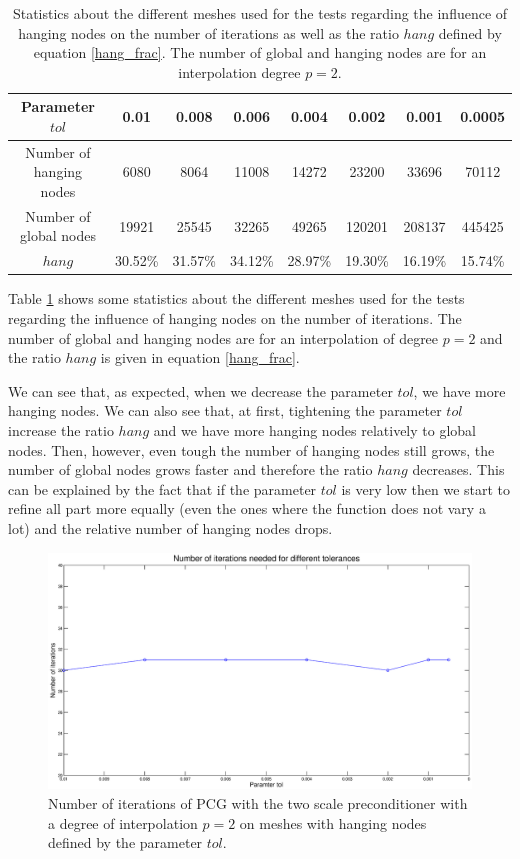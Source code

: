 \begin{table}
\centering
\begin{tabular}{c|ccccccc}
Parameter $tol$ & 0.01 & 0.008 & 0.006 & 0.004 & 0.002 & 0.001 & 0.0005\\
\hline
Number of hanging nodes & 6080 & 8064 & 11008 & 14272 & 23200 & 33696 & 70112\\
Number of global nodes & 19921 & 25545 & 32265 & 49265 & 120201 & 208137 & 445425\\
$hang$ & 30.52\% & 31.57\% & 34.12\% & 28.97\% & 19.30\% & 16.19\% & 15.74\%
\end{tabular}
\caption{Statistics about the different meshes used for the tests regarding the influence of hanging nodes on the number of iterations as well as the ratio $hang$ defined by equation \ref{hang_frac}. The number of global and hanging nodes are for an interpolation degree $p=2$.}
\label{two_hang_table}
\end{table}

Table \ref{two_hang_table} shows some statistics about the different meshes used for the tests regarding the influence of hanging nodes on the number of iterations. The number of global and hanging nodes are for an interpolation of degree $p=2$ and the ratio $hang$ is given in equation \ref{hang_frac}.

We can see that, as expected, when we decrease the parameter $tol$, we have more hanging nodes. We can also see that, at first, tightening the parameter $tol$ increase the ratio $hang$ and we have more hanging nodes relatively to global nodes. Then, however, even tough the number of hanging nodes still grows, the number of global nodes grows faster and therefore the ratio $hang$ decreases. This can be explained by the fact that if the parameter $tol$ is very low then we start to refine all part more equally (even the ones where the function does not vary a lot) and the relative number of hanging nodes drops. 

\begin{figure}
\centering
\includegraphics[scale=0.35]{Results/two_hang_iter.eps}
\caption{Number of iterations of PCG with the two scale preconditioner with a degree of interpolation $p=2$ on meshes with hanging nodes defined by the parameter $tol$.}
\label{two_hang_iter}
\end{figure}


